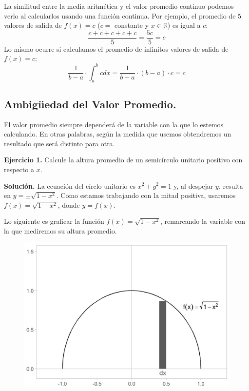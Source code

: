 \documentclass[12pt]{article}
\begin{document}
La similitud entre la media aritmética y el valor promedio continuo podemos verlo al calcularlos usando una función continua. Por ejemplo, el promedio de $5$ valores de salida de $f(x) = c$ ($c =$ constante y $x \in \mathbb{R}$) es igual a $c$:
\[
  \frac{c + c + c + c + c}{5} = \frac{5c}{5} = c
\]
Lo mismo ocurre si calculamos el promedio de infinitos valores de salida de $f(x) = c$:
\[
  \frac{1}{b - a} \cdot \int_{a}^{b} cdx = \frac{1}{b - a} \cdot (b - a) \cdot c = c
\]

\subsection{Ambigüedad del Valor Promedio.}

El valor promedio siempre dependerá de la variable con la que lo estemos calculando. En otras palabras, según la medida que usemos obtendremos un resultado que será distinto para otra.

\textbf{Ejercicio 1.} Calcule la altura promedio de un semicírculo unitario positivo con respecto a $x$.

\textbf{Solución.} La ecuación del círclo unitario es $x^{2} + y^{2} = 1$ y, al despejar $y$, resulta en $y = \pm \sqrt{1 - x^{2}}$. Como estamos trabajando con la mitad positiva, usaremos $f(x) = \sqrt{1 - x^{2}}$, donde $y = f(x)$.

Lo siguiente es graficar la función $f(x) = \sqrt{1 - x^{2}}$, remarcando la variable con la que mediremos su altura promedio.

\begin{figure}[hbt!]
\centering
\includegraphics[scale=0.7]{img/avg-val-ex-1.jpg}
\end{figure}
\end{document}
